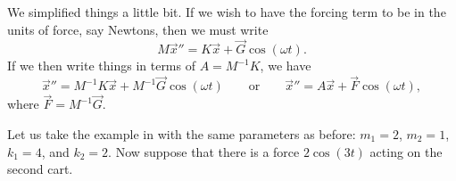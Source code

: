 \documentclass{ximera}
\begin{document}
We simplified things a little bit.  If we wish to have the forcing term to be in the units of force, say Newtons, then we must write
\begin{equation*}
    M \vec{x}'' = K \vec{x} + \vec{G} \cos(\omega t) .
\end{equation*}
If we then write things in terms of $A = M^{-1} K$, we have
\begin{equation*}
    \vec{x}'' = M^{-1}K \vec{x} + M^{-1} \vec{G} \cos(\omega t) \qquad \text{or} \qquad \vec{x}'' = A \vec{x} + \vec{F} \cos(\omega t) ,
\end{equation*}
where $\vec{F} = M^{-1} \vec{G}$.

\begin{example}
    Let us take the example in  with the same parameters as before: $m_1 = 2$, $m_2 = 1$, $k_1 = 4$, and $k_2 = 2$.  Now suppose that there is a force $2 \cos (3t)$ acting on the second cart.
\end{example}
\end{document}
